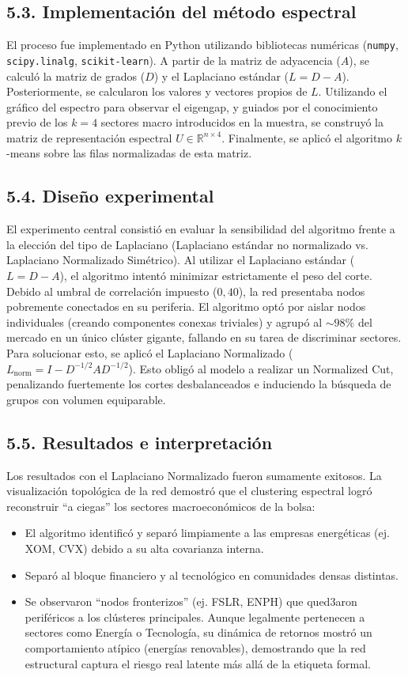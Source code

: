 \documentclass{article}
\begin{document}
	\subsection*{5.3. Implementación del método espectral}
	El proceso fue implementado en Python utilizando bibliotecas numéricas (\texttt{numpy}, \texttt{scipy.linalg}, \texttt{scikit-learn}). A partir de la matriz de adyacencia (\(A\)), se calculó la matriz de grados (\(D\)) y el Laplaciano estándar (\(L = D - A\)). Posteriormente, se calcularon los valores y vectores propios de \(L\). Utilizando el gráfico del espectro para observar el eigengap, y guiados por el conocimiento previo de los \(k = 4\) sectores macro introducidos en la muestra, se construyó la matriz de representación espectral \(U \in \mathbb{R}^{n \times 4}\). Finalmente, se aplicó el algoritmo \(k\)-means sobre las filas normalizadas de esta matriz.
	
	\subsection*{5.4. Diseño experimental}
	El experimento central consistió en evaluar la sensibilidad del algoritmo frente a la elección del tipo de Laplaciano (Laplaciano estándar no normalizado vs. Laplaciano Normalizado Simétrico). Al utilizar el Laplaciano estándar (\(L = D - A\)), el algoritmo intentó minimizar estrictamente el peso del corte. Debido al umbral de correlación impuesto ($0{,}40$), la red presentaba nodos pobremente conectados en su periferia. El algoritmo optó por aislar nodos individuales (creando componentes conexas triviales) y agrupó al \(\sim 98\%\) del mercado en un único clúster gigante, fallando en su tarea de discriminar sectores. Para solucionar esto, se aplicó el Laplaciano Normalizado (\(L_{\text{norm}} = I - D^{-1/2} A D^{-1/2}\)). Esto obligó al modelo a realizar un Normalized Cut, penalizando fuertemente los cortes desbalanceados e induciendo la búsqueda de grupos con volumen equiparable.
	
	\subsection*{5.5. Resultados e interpretación}
	Los resultados con el Laplaciano Normalizado fueron sumamente exitosos. La visualización topológica de la red demostró que el clustering espectral logró reconstruir ``a ciegas'' los sectores macroeconómicos de la bolsa:
	\begin{itemize}
		\item El algoritmo identificó y separó limpiamente a las empresas energéticas (ej. XOM, CVX) debido a su alta covarianza interna.
		\item Separó al bloque financiero y al tecnológico en comunidades densas distintas.
		\item Se observaron ``nodos fronterizos'' (ej. FSLR, ENPH) que qued3aron periféricos a los clústeres principales. Aunque legalmente pertenecen a sectores como Energía o Tecnología, su dinámica de retornos mostró un comportamiento atípico (energías renovables), demostrando que la red estructural captura el riesgo real latente más allá de la etiqueta formal.
	\end{itemize}
	
\end{document}
